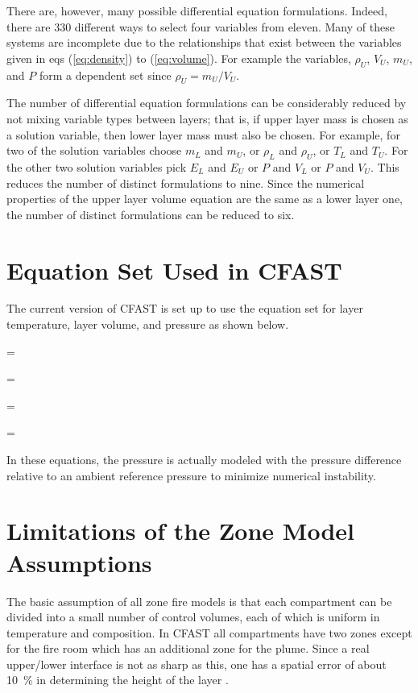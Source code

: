 There are, however, many possible differential equation formulations. Indeed, there are 330
different ways to select four variables from eleven. Many of these systems are incomplete due to
the relationships that exist between the variables given in eqs (\ref{eq:density}) to (\ref{eq:volume}). For example the
variables, $\rho_U$, $V_U$, $m_U$, and $P$ form a dependent set since $\rho_U = m_U / V_U$.

The number of differential equation formulations can be considerably reduced by not mixing
variable types between layers; that is, if upper layer mass is chosen as a solution variable, then
lower layer mass must also be chosen. For example, for two of the solution variables choose $m_L$
and $m_U$, or $\rho_L$ and $\rho_U$, or $T_L$ and $T_U$. For the other two solution variables pick $E_L$ and $E_U$ or $P$ and $V_L$ or $P$ and $V_U$. This reduces the number of distinct formulations to nine. Since the numerical properties of the upper layer volume equation are the same as a lower layer one, the number of
distinct formulations can be reduced to six.

\section{Equation Set Used in CFAST}

The current version of CFAST is set up to use the equation set for layer temperature, layer
volume, and pressure as shown below.

\be {} =    \ee

\be {} =   \ee

\be {} =   \ee

\be {} =   \ee

In these equations, the pressure is actually modeled with the pressure difference relative to an
ambient reference pressure to minimize numerical instability.

\section{Limitations of the Zone Model Assumptions}

The basic assumption of all zone fire models is that each compartment can be divided into a
small number of control volumes, each of which is uniform in temperature and composition. In
CFAST all compartments have two zones except for the fire room which has an additional zone
for the plume. Since a real upper/lower interface is not as sharp as this, one has a spatial error of
about 10~\% in determining the height of the layer \cite{Steckler:1982, Quintiere:1984}.

